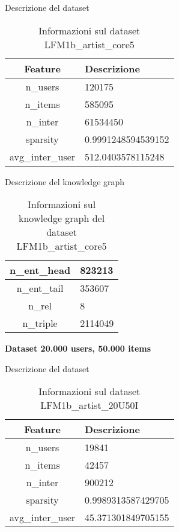 \noindent Descrizione del dataset
\begin{table}[H]
    \centering
    \footnotesize
    \begin{tabularx}{\textwidth}{|c|X|}
        \hline
        \textbf{Feature} & \textbf{Descrizione} \\
        \hline
        n\_users & 120175 \\
        \hline
        n\_items & 585095 \\
        \hline
        n\_inter & 61534450 \\
        \hline
        sparsity & 0.9991248594539152 \\
        \hline
        avg\_inter\_user & 512.0403578115248 \\
        \hline
    \end{tabularx}
    \caption{Informazioni sul dataset LFM1b\_artist\_core5}
    \label{tab:dataset_info}
\end{table}


\noindent Descrizione del knowledge graph
\begin{table}[H]
    \centering
    \footnotesize
    \begin{tabularx}{\textwidth}{|c|X|}
        \hline
        n\_ent\_head & 823213 \\
        \hline
        n\_ent\_tail & 353607 \\
        \hline
        n\_rel & 8 \\
        \hline
        n\_triple & 2114049 \\
        \hline
    \end{tabularx}
    \caption{Informazioni sul knowledge graph del dataset LFM1b\_artist\_core5}
    \label{tab:dataset_info}
\end{table}


\noindent\textbf{Dataset 20.000 users, 50.000 items}

\noindent Descrizione del dataset
\begin{table}[H]
    \centering
    \footnotesize
    \begin{tabularx}{\textwidth}{|c|X|}
        \hline
        \textbf{Feature} & \textbf{Descrizione} \\
        \hline
        n\_users & 19841 \\
        \hline
        n\_items & 42457 \\
        \hline
        n\_inter & 900212 \\
        \hline
        sparsity & 0.9989313587429705 \\
        \hline
        avg\_inter\_user & 45.371301849705155 \\
        \hline
    \end{tabularx}
    \caption{Informazioni sul dataset LFM1b\_artist\_20U50I}
    \label{tab:dataset_info}
\end{table}


